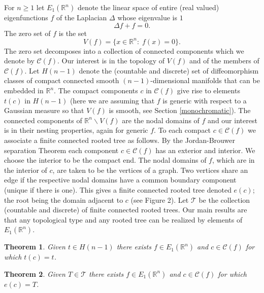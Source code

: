 \documentclass[11pt,reqno]{amsart}
\newcommand{\R}{{\mathbb R}}
\newtheorem{theorem}{Theorem}
\theoremstyle{definition}
\begin{document}
For $n \geq 1$ let $E_1(\R^n)$ denote the linear space of entire (real valued) eigenfunctions $f$ of the Laplacian $\Delta$ whose eigenvalue is $1$
\begin{equation}\label{E:0}
\Delta f + f=0.
\end{equation}
The zero set  of $f$ is the set 
\[V(f)=\{x \in \R^n:\; f(x)=0\}.\]
The zero set decomposes into a collection of connected components which we denote by $\mathcal C(f)$. Our interest is in the topology of $V(f)$ and of the members of $\mathcal C(f)$. Let $H(n-1)$ denote the (countable and discrete) set of diffeomorphism classes of compact connected smooth $(n-1)$-dimensional manifolds that can be embedded in $\R^n$. The compact components $c$ in $\mathcal C(f)$ give rise to elements $t(c)$ in $H(n-1)$ (here we are assuming that $f$ is generic with respect to a Gaussian measure so that $V(f)$ is smooth, see Section \ref{monochromatic}). The connected components of $\R^n \backslash V(f)$ are the nodal domains of $f$ and our interest is in their nesting properties, again for generic $f$. To each compact $c \in \mathcal C(f)$ we associate a finite connected rooted tree as follows. By the Jordan-Brouwer  separation Theorem \cite{Li} each component  $c \in \mathcal C(f)$ has an exterior and interior. We choose the interior to be the compact end. The nodal domains of $f$, which are in the interior of $c$, are taken to be the vertices of a graph. Two vertices share an edge if the respective nodal domains have a common boundary component (unique if there is one). This gives a finite connected rooted tree  denoted $e(c)$; the root being the domain adjacent to $c$ (see Figure 2). Let $\mathcal T$ be the collection (countable and discrete) of finite connected rooted trees. Our main results are that any topological type and any rooted tree can be realized by elements of $E_1(\R^n)$.


\begin{theorem}\label{main theorem R a}
 Given $t \in H(n-1)$ there exists $f \in E_1(\R^n)$ and $c\in \mathcal C(f)$ for which $t(c)=t$.
\end{theorem}	
\begin{theorem}\label{main theorem R b}
Given $T \in \mathcal T$ there exists $f \in E_1(\R^n)$ and $c \in \mathcal C(f)$ for which $e(c)=T$.
\end{theorem}	
\end{document}
